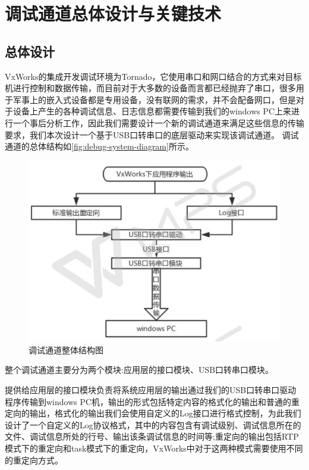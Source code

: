 \chapter{调试通道总体设计与关键技术}

\section{总体设计}
	VxWorks的集成开发调试环境为Tornado，它使用串口和网口结合的方式来对目标机进行控制和数据传输，而目前对于大多数的设备而言都已经抛弃了串口，很多用于军事上的嵌入式设备都是专用设备，没有联网的需求，并不会配备网口，但是对于设备上产生的各种调试信息、日志信息都需要传输到我们的windows PC上来进行一个事后分析工作，因此我们需要设计一个新的调试通道来满足这些信息的传输要求，我们本次设计一个基于USB口转串口的底层驱动来实现该调试通道。
	调试通道的总体结构如\autoref{fig:debug-system-diagram}所示。
\begin{figure}[!h]
\centering
\includegraphics[width=.9\textwidth]{./graphics/debug-system-diagram.pdf}
\caption{调试通道整体结构图}\label{fig:debug-system-diagram}
\end{figure}
	
	整个调试通道主要分为两个模块:应用层的接口模块、USB口转串口模块。
	
	提供给应用层的接口模块负责将系统应用层的输出通过我们的USB口转串口驱动程序传输到windows PC机，输出的形式包括特定内容的格式化的输出和普通的重定向的输出，格式化的输出我们会使用自定义的Log接口进行格式控制，为此我们设计了一个自定义的Log协议格式，其中的内容包含有调试级别、调试信息所在的文件、调试信息所处的行号、输出该条调试信息的时间等;重定向的输出包括RTP模式下的重定向和task模式下的重定向，VxWorks中对于这两种模式需要使用不同的重定向方式。
	

